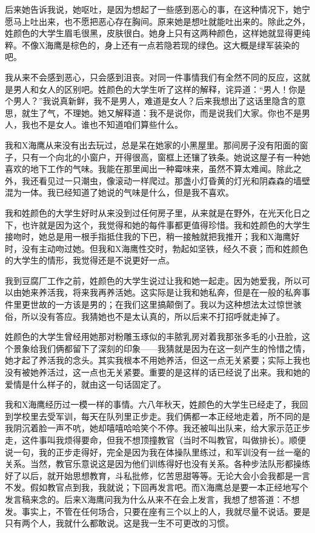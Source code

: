 后来她告诉我说，她呕吐，是因为想起了一些感到恶心的事，在这种情况下，她宁愿马上吐出来，也不愿把恶心存在胸间。原来她是想吐就能吐出来的。除此之外，姓颜色的大学生眉毛很黑，皮肤很白。她身上只有这两种颜色，这样她就显得更纯粹。不像X海鹰是棕色的，身上还有一点若隐若现的绿色。这大概是绿军装染的吧。 

我从来不会感到恶心，只会感到沮丧。对同一件事情我们有全然不同的反应，这就是男人和女人的区别吧。姓颜色的大学生听了这样的解释，诧异道：“男人！你是个男人？”我说真新鲜，我不是男人，难道是女人？后来我想出了这话里隐含的意思，就生了气，不理她。她又解释道：我不是说你，而是说我们大家。你也不是男人，我也不是女人。谁也不知道咱们算些什么。 

我和X海鹰从来没有出去玩过，总是呆在她家的小黑屋里。那间房子没有阳面的窗子，只有一个向北的小窗户，开得很高，窗框上还镶了铁条。她说这屋子有一种她喜欢的地下工作的气味。我能在那里闻出一种霉味来，虽然不算太难闻。除此之外，我还看见过一只潮虫，像滚动一样爬过。那盏小灯昏黄的灯光和阴森森的墙壁混为一体。我已经知道了她说的气味是什么，但是我不喜欢。 

我和姓颜色的大学生好时从来没到过任何房子里，从来就是在野外，在光天化日之下，也许就是因为这个，我觉得和她的每件事都更值得珍惜。我和姓颜色的大学生接吻时，她总是用一根手指抵住我的下巴，稍一接触就把我推开；我和X海鹰好时，没有主动吻过她。但我和X海鹰性交时，勃起如坚铁，经久不衰；而和姓颜色的大学生的情形，我觉得还是不说更好一点。 

我到豆腐厂工作之前，姓颜色的大学生说过让我和她一起走。因为她爱我，所以可以由她来养活我，将来我再养活她。这实际是让我和她私奔，但是在一般的私奔事件里更世故的一方该是男的；在我们这里搞颠倒了。我以为这种想法太过惊世骇俗，所以没有答应。我猜她也不是太认真的，所以后来不打招呼就走掉了。 

姓颜色的大学生曾经用她那对粉雕玉琢似的丰脓乳房对着我那张多毛的小丑脸，这个景象给我们俩都留下了深刻的印象——我猜就是因为在这一刻产生的怜惜之情，她才起了养活我的念头。其实我根本不用她养活，但这一点无关紧要；实际上我也没有被她养活过，这一点也无关紧要。重要的是这样的话已经说了出来。我和她的爱情是什么样子的，就由这一句话固定了。 

我和X海鹰经历过一模一样的事情。六八年秋天，姓颜色的大学生已经走了，我回到学校里去受军训，每天在队列里正步走。我们俩都一本正经地走着，所不同的是我阴沉着脸一声不吭，她却嘻嘻哈哈笑个不停。我还被叫出队来，给大家示范正步走，这件事叫我烦得要命，但我不想顶撞教官（当时不叫教官，叫做排长）。顺便说一句，我的正步走得好，完全是因为我在体操队里练过，和军训没有一丝一毫的关系。当然，教官乐意说这是因为他们训练得好也没有关系。各种步法队形都操练好了以后，就开始思想教育，斗私批修，忆苦思甜等等。无论大会小会我都是一言不发。假如教官点到我，我就说；下回再发言吧。而X海鹰总是要一本正经地写个发言稿来念的。后来X海鹰问我为什么从来不在会上发言，我想了想答道：不想发。事实上，不管在任何场合，只要在座有三个以上的人，我就尽量不说话。要是只有两个人，我就什么都敢说。这是我一生不可更改的习惯。 

